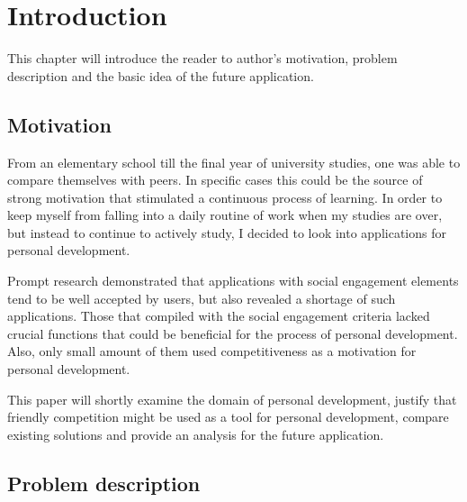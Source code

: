 

\chapter{Introduction}\label{ch:introduction}

This chapter will introduce the reader to author's motivation, problem description and the basic idea of the future application.


\section{Motivation}\label{sec:introduction-motivation}

From an elementary school till the final year of university studies, one was able to compare themselves with peers.
In specific cases this could be the source of strong motivation that stimulated a continuous process of learning.
In order to keep myself from falling into a daily routine of work when my studies are over,
but instead to continue to actively study, I decided to look into applications for personal development.

Prompt research demonstrated that applications with social engagement elements tend to be well accepted by users,
but also revealed a shortage of such applications.
Those that compiled with the social engagement criteria lacked crucial functions that could be beneficial for the process of personal development.
Also, only small amount of them used competitiveness as a motivation for personal development.

This paper will shortly examine the domain of personal development, justify that friendly competition might be used as a tool for personal development,
compare existing solutions and provide an analysis for the future application.


\section{Problem description}\label{sec:problem-description}

